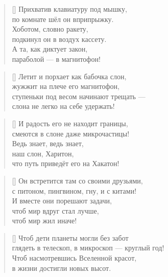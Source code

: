 \documentclass[a5paper,11pt]{memoir}
\begin{document}
\begin{verse}[\versewidth]
Прихватив клавиатуру под мышку,\\
по комнате шёл он вприпрыжку.\\
Хоботом, словно ракету,\\
подкинул он в воздух кассету.\\
А та, как диктует закон,\\
параболой --- в магнитофон!
\end{verse}

\begin{verse}[\versewidth]
Летит и порхает как бабочка слон,\\
жужжит на плече его магнитофон,\\
ступеньки под весом начинают трещать --- \\
слона не легко на себе удержать!
\end{verse}

\newpage


\BgThispage



\begin{verse}[\versewidth]
И радость его не находит границы,\\
смеются в слоне даже микрочастицы!\\
Ведь знает, ведь знает,\\
наш слон, Харитон,\\
что путь приведёт его на Хакатон!
\end{verse}



\begin{verse}[\versewidth]
Он встретится там со своими друзьями,\\
с питоном, пингвином, гну, и с китами!\\
И вместе они порешают задачи,\\
чтоб мир вдруг стал лучше,\\
чтоб мир жил иначе!
\end{verse}


\begin{verse}[\versewidth]
Чтоб дети планеты могли без забот\\
глядеть в телескоп, в микроскоп --- круглый год!\\
Чтоб насмотревшись Вселенной красот,\\
в жизни достигли новых высот.
\end{verse}
\end{document}
